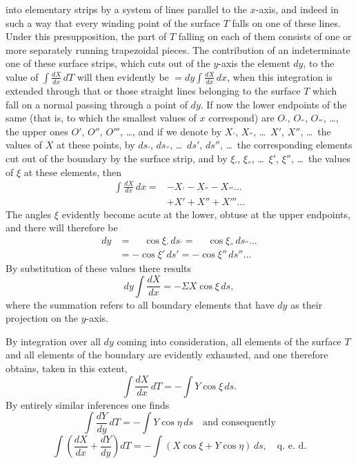\documentclass{article}
\begin{document}
into elementary strips by a system of lines parallel to the $x$-axis, and indeed in such a way that every winding point of the surface $T$ falls on one of these lines. Under this presupposition, the part of $T$ falling on each of them consists of one or more separately running trapezoidal pieces. The contribution of an indeterminate one of these surface strips, which cuts out of the $y$-axis the element $dy$, to the value of $\displaystyle\int \frac{dX}{dx}\,dT$ will then evidently be $= dy\displaystyle\int \frac{dX}{dx}\,dx$, when this integration is extended through that or those straight lines belonging to the surface $T$ which fall on a normal passing through a point of $dy$. If now the lower endpoints of the same (that is, to which the smallest values of $x$ correspond) are $O_{'}$, $O_{''}$, $O_{'''}$, \dots, the upper ones $O'$, $O''$, $O'''$, \dots, and if we denote by $X_{'}$, $X_{''}$, \dots\ $X'$, $X''$, \dots\ the values of $X$ at these points, by $ds_{'}$, $ds_{''}$, \dots\ $ds'$, $ds''$, \dots\ the corresponding elements cut out of the boundary by the surface strip, and by $\xi_{'}$, $\xi_{''}$, \dots\ $\xi'$, $\xi''$, \dots\ the values of $\xi$ at these elements, then
\[
\begin{aligned}
\int \frac{dX}{dx}\,dx = & - X_{'} - X_{''} - X_{'''} \dots \\
& + X' + X'' + X''' \dots
\end{aligned}
\]
The angles $\xi$ evidently become acute at the lower, obtuse at the upper endpoints, and there will therefore be
\[
\begin{aligned}
dy &= \phantom{-}\cos\xi_{'}\,ds_{'} = \phantom{-}\cos\xi_{''}\,ds_{''} \dots \\
&= -\cos\xi'\,ds' = -\cos\xi''\,ds'' \dots
\end{aligned}
\]
By substitution of these values there results
\[
dy \int \frac{dX}{dx} = -\Sigma X\cos\xi\,ds,
\]
where the summation refers to all boundary elements that have $dy$ as their projection on the $y$-axis.

By integration over all $dy$ coming into consideration, all elements of the surface $T$ and all elements of the boundary are evidently exhausted, and one therefore obtains, taken in this extent,
\[
\int \frac{dX}{dx}\,dT = -\int Y\cos\xi\,ds.
\]
By entirely similar inferences one finds
\[
\int \frac{dY}{dy}\,dT = -\int Y\cos\eta\,ds \quad \text{and consequently}
\]
\[
\int \left(\frac{dX}{dx} + \frac{dY}{dy}\right) dT = -\int (X\cos\xi + Y\cos\eta)\,ds, \quad \text{q.\ e.\ d.}
\]
\end{document}
